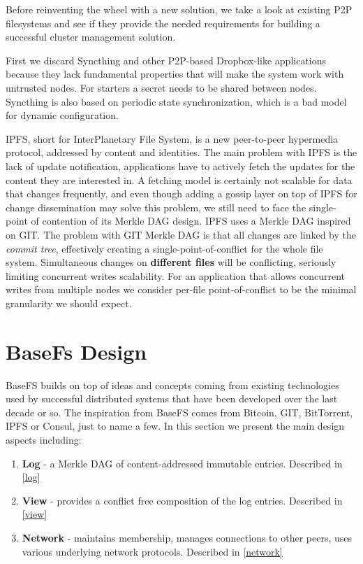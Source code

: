 \documentclass{sig-alternate}
\begin{document}
Before reinventing the wheel with a new solution, we take a look at existing P2P filesystems and see if they provide the needed requirements for building a successful cluster management solution. 

First we discard Syncthing and other P2P-based Dropbox-like applications because they lack fundamental properties that will make the system work with untrusted nodes. For starters a secret needs to be shared between nodes. Syncthing is also based on periodic state synchronization, which is a bad model for dynamic configuration.

IPFS, short for InterPlanetary File System, is a new peer-to-peer hypermedia protocol, addressed by content and identities. The main problem with IPFS is the lack of update notification, applications have to actively fetch the updates for the content they are interested in. A fetching model is certainly not scalable for data that changes frequently, and even though adding a gossip layer on top of IPFS for change dissemination may solve this problem, we still need to face the single-point of contention of its Merkle DAG design. IPFS uses a Merkle DAG inspired on GIT. The problem with GIT Merkle DAG is that all changes are linked by the \textit{commit tree}, effectively creating a single-point-of-conflict for the whole file system. Simultaneous changes on \textbf{different files} will be conflicting, seriously limiting concurrent writes scalability. For an application that allows concurrent writes from multiple nodes we consider per-file point-of-conflict to be the minimal granularity we should expect.


\section{BaseFs Design}

BaseFS builds on top of ideas and concepts coming from existing technologies used by successful distributed systems that have been developed over the last decade or so. The inspiration from BaseFS comes from Bitcoin, GIT, BitTorrent, IPFS or Consul, just to name a few. In this section we present the main design aspects including:

\begin{enumerate}
\item \textbf{Log} - a Merkle DAG of content-addressed immutable entries. Described in \ref{log}
\item \textbf{View} - provides a conflict free composition of the log entries. Described in \ref{view}
\item \textbf{Network} - maintains membership, manages connections to other peers, uses various underlying network protocols. Described in \ref{network}
\end{enumerate}
\end{document}
